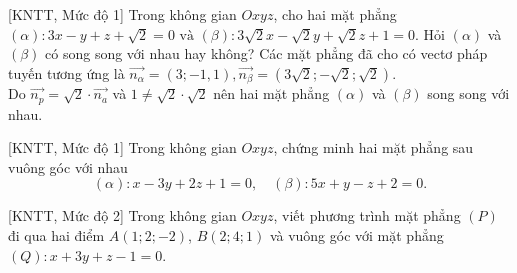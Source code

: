 \begin{bt}%
	[KNTT, Mức độ 1]%
	Trong không gian $Oxyz$, cho hai mặt phẳng		
	$(\alpha)\colon 3 x-y+z+\sqrt{2}=0 \text { và }(\beta)\colon 3 \sqrt{2} x-\sqrt{2} y+\sqrt{2} z+1=0.
	$		
	Hỏi $(\alpha)$ và  $(\beta)$ có song song với nhau hay không?
	\loigiai
	{			
		Các mặt phẳng đã cho có vectơ pháp tuyến tương ứng là $\overrightarrow{n_\alpha}=(3;-1{,}1), \overrightarrow{n_{\beta}}=(3\sqrt{2};-\sqrt{2};\sqrt{2})$.\\
		Do $\overrightarrow{n_p}=\sqrt{2}\cdot\overrightarrow{n_a}$ và $1\neq\sqrt{2}\cdot\sqrt{2}$ nên hai mặt phẳng $(\alpha)$ và $(\beta)$ song song với nhau.
	}
\end{bt}

\begin{bt}%
[KNTT, Mức độ 1]%
	Trong không gian $Oxyz$, chứng minh hai mặt phẳng sau vuông góc với nhau
	$$(\alpha)\colon x-3y+2z+1=0,\quad (\beta)\colon 5x+y-z+2=0.$$
\end{bt}

\begin{bt}%
[KNTT, Mức độ 2]%
	Trong không gian $Oxyz$, viết phương trình mặt phẳng $(P)$ đi qua hai điểm $A(1;2;-2)$, $B(2;4;1)$ và vuông góc với mặt phẳng $(Q)\colon x+3y+z-1=0$.
\end{bt}


